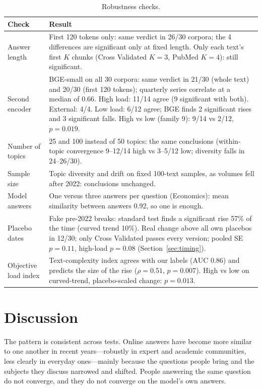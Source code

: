 \documentclass[11pt]{article}
\begin{document}
\begin{table}[H]
\centering
\caption{Robustness checks.}
\label{tab:robust}
\small
\begin{tabularx}{\linewidth}{p{4.2cm}X}
\toprule
Check & Result \\
\midrule
Answer length & First 120 tokens only: same verdict in 26/30 corpora; the 4 differences are significant only at fixed length. Only each text's first $K$ chunks (Cross Validated $K=3$, PubMed $K=4$): still significant. \\
Second encoder & BGE-small \citep{xiao2023cpack} on all 30 corpora: same verdict in 21/30 (whole text) and 20/30 (first 120 tokens); quarterly series correlate at a median of 0.66. High load: 11/14 agree (9 significant with both). External: 4/4. Low load: 6/12 agree; BGE finds 2 significant rises and 3 significant falls. High vs low (family 9): 9/14 vs 2/12, $p=0.019$. \\
Number of topics & 25 and 100 instead of 50 topics: the same conclusions (within-topic convergence 9--12/14 high vs 3--5/12 low; diversity falls in 24--26/30). \\
Sample size & Topic diversity and drift on fixed 100-text samples, as volumes fell after 2022: conclusions unchanged. \\
Model answers & One versus three answers per question (Economics): mean similarity between answers 0.92, so one is enough. \\
Placebo dates & Fake pre-2022 breaks: standard test finds a significant rise 57\% of the time (curved trend 10\%). Real change above all own placebos in 12/30; only Cross Validated passes every version; pooled SE $p=0.11$, high-load $p=0.08$ (Section~\ref{sec:timing}). \\
Objective load index & Text-complexity index agrees with our labels (AUC 0.86) and predicts the size of the rise ($\rho=0.51$, $p=0.007$). High vs low on curved-trend, placebo-scaled change: $p=0.013$. \\
\bottomrule
\end{tabularx}
\end{table}

\section{Discussion}

The pattern is consistent across tests. Online answers have become more similar to one another in
recent years---robustly in expert and academic communities, less clearly in everyday ones---mainly
because the questions people bring and the subjects they discuss narrowed and shifted. People
answering the same question do not converge, and they do not converge on the model's own answers.
\end{document}
